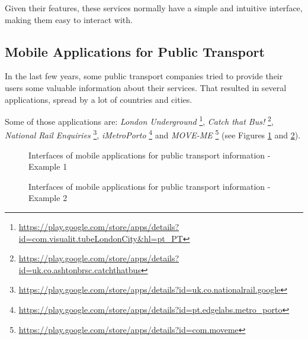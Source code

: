Given their features, these services normally have a simple and intuitive interface, making them easy to interact with.

\subsection{Mobile Applications for Public Transport}

In the last few years, some public transport companies tried to provide their users some valuable information about their services. That resulted in several applications, spread by a lot of countries and cities.

Some of those applications are: \emph{London Underground} \footnote{\url{https://play.google.com/store/apps/details?id=com.visualit.tubeLondonCity&hl=pt_PT}}, \emph{Catch that Bus!} \footnote{\url{https://play.google.com/store/apps/details?id=uk.co.ashtonbrsc.catchthatbus}}, \emph{National Rail Enquiries} \footnote{\url{https://play.google.com/store/apps/details?id=uk.co.nationalrail.google}}, \emph{iMetroPorto} \footnote{\url{https://play.google.com/store/apps/details?id=pt.edgelabs.metro_porto}} and \emph{MOVE-ME} \footnote{\url{https://play.google.com/store/apps/details?id=com.moveme}} (see Figures \ref{fig:interfaces1} and \ref{fig:interfaces2}).

\begin{figure}[h]
\begin{center}
\leavevmode
{} \hspace{1em}%
\caption{Interfaces of mobile applications for public transport information - Example 1}
\label{fig:interfaces1}
\end{center}
\end{figure}

\begin{figure}[h]
\begin{center}
\leavevmode
{} \hspace{1em}%
\caption{Interfaces of mobile applications for public transport information - Example 2}
\label{fig:interfaces2}
\end{center}
\end{figure}



